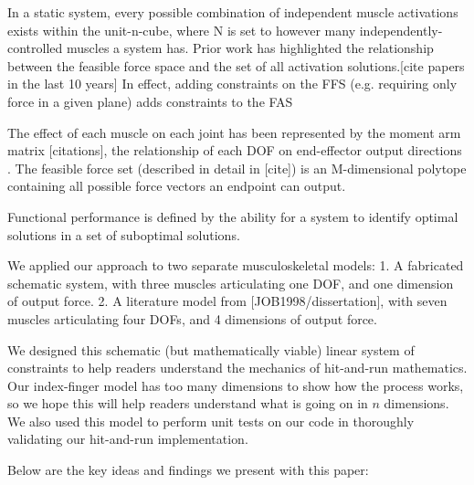 In a static system, every possible combination of independent muscle activations exists within the unit-n-cube, where N is set to however many independently-controlled muscles a system has.
Prior work has highlighted the relationship between the feasible force space and the set of all activation solutions.[cite papers in the last 10 years]
In effect, adding constraints on the FFS (e.g. requiring only force in a given plane) adds constraints to the FAS

The effect of each muscle on each joint has been represented by the moment arm matrix [citations], the relationship of each DOF on end-effector output directions .
The feasible force set (described in detail in [cite]) is an M-dimensional polytope containing all possible force vectors an endpoint can output.

Functional performance is defined by the ability for a system to identify optimal solutions in a set of suboptimal solutions. 

We applied our approach to two separate musculoskeletal models:
1. A fabricated schematic system, with three muscles articulating one DOF, and one dimension of output force.
2. A literature model from [JOB1998/dissertation], with seven muscles articulating four DOFs, and 4 dimensions of output force.

We designed this schematic (but mathematically viable) linear system of constraints to help readers understand the mechanics of hit-and-run mathematics. Our index-finger model has too many dimensions to show how the process works, so we hope this will help readers understand what is going on in $n$ dimensions. We also used this model to perform unit tests on our code in thoroughly validating our hit-and-run implementation.

Below are the key ideas and findings we present with this paper:\\


